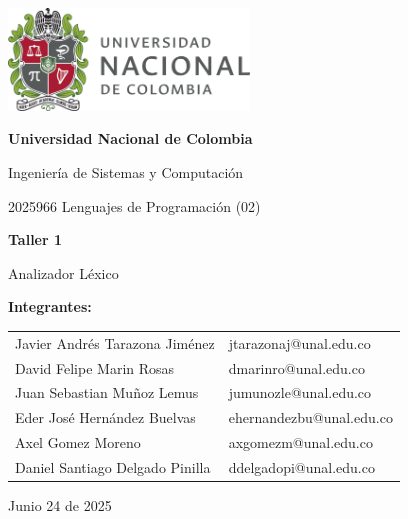 \documentclass{article}
\begin{document}
\begin{titlepage}
  \centering
  \includegraphics[width=0.48\textwidth]{logo_universidad.png}
  \par\vspace{2cm}

  {\Large \textbf{Universidad Nacional de Colombia} \par}
  \vspace{0.5cm}
  {\large Ingeniería de Sistemas y Computación \par}
  {\large 2025966 Lenguajes de Programación (02)\par}
  \vspace{3cm}

  {\large \textbf{Taller 1} \par}
  {\large Analizador Léxico\par}
  \vspace{3cm}

  {\large \textbf{Integrantes:} \par}
  \vspace{0.5cm}
  \begin{tabular}{ll}
    Javier Andrés Tarazona Jiménez   & jtarazonaj@unal.edu.co \\
    David Felipe Marin Rosas         & dmarinro@unal.edu.co   \\
    Juan Sebastian Muñoz Lemus       & jumunozle@unal.edu.co          \\
    Eder José Hernández Buelvas      & ehernandezbu@unal.edu.co          \\
    Axel Gomez Moreno                & axgomezm@unal.edu.co          \\
    Daniel Santiago Delgado Pinilla  & ddelgadopi@unal.edu.co          \\
  \end{tabular}
  \par\vspace{3cm}

  {\large Junio 24 de 2025 \par}
\end{titlepage}
\end{document}
